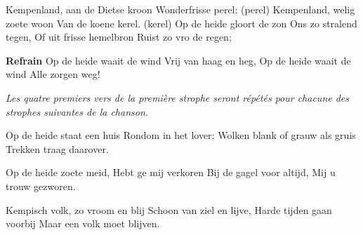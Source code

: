 \footnotemark [
ititle={Kempenland}]


\beginverse
Kempenland, aan de Dietse kroon
Wonderfrisse perel; (perel)
Kempenland, welig zoete woon
Van de koene kerel. (kerel)
Op de heide gloort de zon
Ons zo stralend tegen,
Of uit frisse hemelbron
Ruist zo vro de regen;
\endverse

\beginchorus
\textbf{Refrain}
Op de heide waait de wind
Vrij van haag en heg,
Op de heide waait de wind
Alle zorgen weg!
\endchorus

\emph{Les quatre premiers vers de la première strophe seront répétés pour chacune des strophes suivantes de la chanson.}

\beginverse
Op de heide staat een huis
Rondom in het lover;
Wolken blank of grauw als gruis
Trekken traag daarover.
\endverse

\beginverse
Op de heide zoete meid,
Hebt ge mij verkoren
Bij de gagel voor altijd,
Mij u trouw gezworen.
\endverse

\beginverse
Kempisch volk, zo vroom en blij
Schoon van ziel en lijve,
Harde tijden gaan voorbij
Maar een volk moet blijven.
\endverse
\endsong